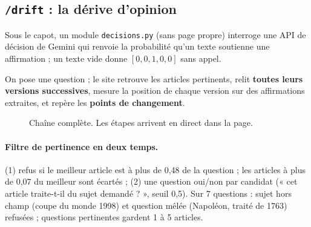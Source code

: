 \documentclass[11pt,a4paper]{article}
\begin{document}
\subsection{\texttt{/drift} : la dérive d'opinion}
Sous le capot, un module \texttt{decisions.py} (sans page propre) interroge une API de décision de Gemini qui renvoie la probabilité qu'un texte soutienne une affirmation ; un texte vide donne $[0,0,1,0,0]$ sans appel.

On pose une question ; le site retrouve les articles pertinents, relit \textbf{toutes leurs versions successives}, mesure la position de chaque version sur des affirmations extraites, et repère les \textbf{points de changement}.

\begin{figure}[H]\centering
{}
\caption{Chaîne complète. Les étapes arrivent en direct dans la page.}
\end{figure}

\paragraph{Filtre de pertinence en deux temps.}
(1) refus si le meilleur article est à plus de 0,48 de la question ; les articles à plus de 0,07 du meilleur sont écartés ; (2) une question oui/non par candidat (« cet article traite-t-il du sujet demandé ? », seuil 0,5). Sur 7 questions : sujet hors champ (coupe du monde 1998) et question mêlée (Napoléon, traité de 1763) refusées ; questions pertinentes gardent 1 à 5 articles.
\end{document}
